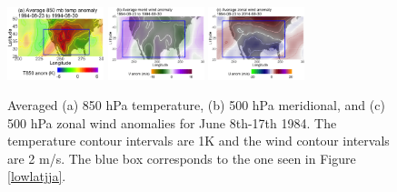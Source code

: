 \documentclass[smallextended]{svjour3}       %
\numberwithin{equation}{section}
\begin{document}
\begin{figure}
\centering
\includegraphics[width=0.25\textwidth]{fig15a}
\includegraphics[width=0.25\textwidth]{fig15b}
\includegraphics[width=0.25\textwidth]{fig15c}
\caption{Averaged (a) 850 hPa temperature, (b) 500 hPa meridional, and (c) 500 hPa zonal wind anomalies for June 8th-17th 1984. The temperature contour intervals are 1K and the wind contour intervals are 2 m/s. The blue box corresponds to the one seen in Figure \ref{lowlatjja}.}\label{avgjja}
\end{figure} 
\end{document}

